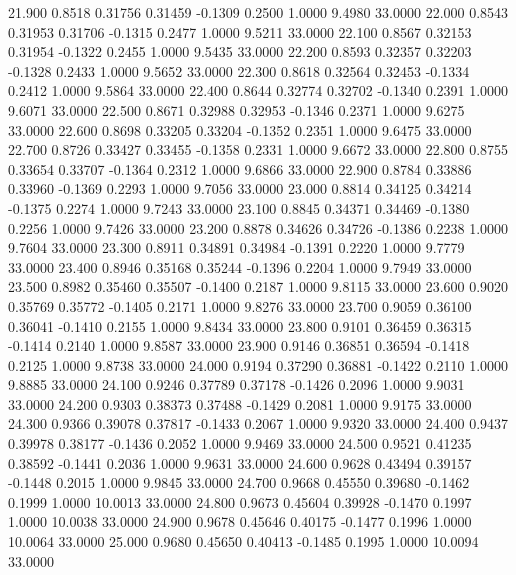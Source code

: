   21.900   0.8518   0.31756   0.31459  -0.1309   0.2500   1.0000   9.4980  33.0000
  22.000   0.8543   0.31953   0.31706  -0.1315   0.2477   1.0000   9.5211  33.0000
  22.100   0.8567   0.32153   0.31954  -0.1322   0.2455   1.0000   9.5435  33.0000
  22.200   0.8593   0.32357   0.32203  -0.1328   0.2433   1.0000   9.5652  33.0000
  22.300   0.8618   0.32564   0.32453  -0.1334   0.2412   1.0000   9.5864  33.0000
  22.400   0.8644   0.32774   0.32702  -0.1340   0.2391   1.0000   9.6071  33.0000
  22.500   0.8671   0.32988   0.32953  -0.1346   0.2371   1.0000   9.6275  33.0000
  22.600   0.8698   0.33205   0.33204  -0.1352   0.2351   1.0000   9.6475  33.0000
  22.700   0.8726   0.33427   0.33455  -0.1358   0.2331   1.0000   9.6672  33.0000
  22.800   0.8755   0.33654   0.33707  -0.1364   0.2312   1.0000   9.6866  33.0000
  22.900   0.8784   0.33886   0.33960  -0.1369   0.2293   1.0000   9.7056  33.0000
  23.000   0.8814   0.34125   0.34214  -0.1375   0.2274   1.0000   9.7243  33.0000
  23.100   0.8845   0.34371   0.34469  -0.1380   0.2256   1.0000   9.7426  33.0000
  23.200   0.8878   0.34626   0.34726  -0.1386   0.2238   1.0000   9.7604  33.0000
  23.300   0.8911   0.34891   0.34984  -0.1391   0.2220   1.0000   9.7779  33.0000
  23.400   0.8946   0.35168   0.35244  -0.1396   0.2204   1.0000   9.7949  33.0000
  23.500   0.8982   0.35460   0.35507  -0.1400   0.2187   1.0000   9.8115  33.0000
  23.600   0.9020   0.35769   0.35772  -0.1405   0.2171   1.0000   9.8276  33.0000
  23.700   0.9059   0.36100   0.36041  -0.1410   0.2155   1.0000   9.8434  33.0000
  23.800   0.9101   0.36459   0.36315  -0.1414   0.2140   1.0000   9.8587  33.0000
  23.900   0.9146   0.36851   0.36594  -0.1418   0.2125   1.0000   9.8738  33.0000
  24.000   0.9194   0.37290   0.36881  -0.1422   0.2110   1.0000   9.8885  33.0000
  24.100   0.9246   0.37789   0.37178  -0.1426   0.2096   1.0000   9.9031  33.0000
  24.200   0.9303   0.38373   0.37488  -0.1429   0.2081   1.0000   9.9175  33.0000
  24.300   0.9366   0.39078   0.37817  -0.1433   0.2067   1.0000   9.9320  33.0000
  24.400   0.9437   0.39978   0.38177  -0.1436   0.2052   1.0000   9.9469  33.0000
  24.500   0.9521   0.41235   0.38592  -0.1441   0.2036   1.0000   9.9631  33.0000
  24.600   0.9628   0.43494   0.39157  -0.1448   0.2015   1.0000   9.9845  33.0000
  24.700   0.9668   0.45550   0.39680  -0.1462   0.1999   1.0000  10.0013  33.0000
  24.800   0.9673   0.45604   0.39928  -0.1470   0.1997   1.0000  10.0038  33.0000
  24.900   0.9678   0.45646   0.40175  -0.1477   0.1996   1.0000  10.0064  33.0000
  25.000   0.9680   0.45650   0.40413  -0.1485   0.1995   1.0000  10.0094  33.0000

